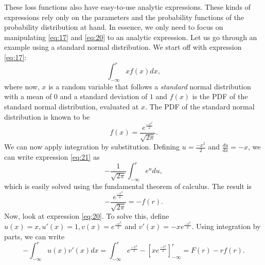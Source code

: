 \documentclass{article}
\begin{document}
\begin{flushleft}
    These loss functions also have easy-to-use analytic expressions.
    These kinds of expressions rely only on the parameters and the probability functions of the probability distribution at hand.
    In essence, we only need to focus on manipulating \ref{eq:17} and \ref{eq:20} to an analytic expression.
    Let us go through an example using a standard normal distribution.
    We start off with expression \ref{eq:17}:
    \begin{equation} \label{eq:21}
        \int_{-\infty}^r xf(x)dx,
    \end{equation}
    where now, $x$ is a random variable that follows a \textit{standard} normal distribution with a mean of $0$ and a standard deviation of $1$ and $f(x)$ is the PDF of the standard normal distribution, evaluated at $x$.
    The PDF of the standard normal distribution is known to be
    \begin{equation*}
        f(x) = \frac{e^\frac{-x^2}{2}}{\sqrt{2\pi}}.
    \end{equation*}
    We can now apply integration by substitution. Defining $u=\frac{-x^2}{2}$ and $\frac{du}{dx} = -x$, we can write expression \ref{eq:21} as
    \begin{equation*}
        -\frac{1}{\sqrt{2\pi}}\int_{-\infty}^r e^udu,
    \end{equation*}
    which is easily solved using the fundamental theorem of calculus. The result is
    \begin{equation} \label{eq:22}
        -\frac{e^{\frac{-r^2}{2}} }{\sqrt{2\pi}}= -f(r).
    \end{equation}
    Now, look at expression \ref{eq:20}.
    To solve this, define $u(x)= x, u'(x)= 1, v(x)=e^{\frac{-x^2}{2}}$ and $v'(x)= -xe^{\frac{-x^2}{2}}$.
    Using integration by parts, we can write
    \begin{equation} \label{eq:23}
        -\int_{-\infty}^r u(x)v'(x)dx = \int_{-\infty}^r e^{\frac{-x^2}{2}} - \left[xe^{\frac{-x^2}{2}}\right]_{-\infty}^r = F(r) - rf(r).
    \end{equation}
\end{flushleft}
\end{document}
